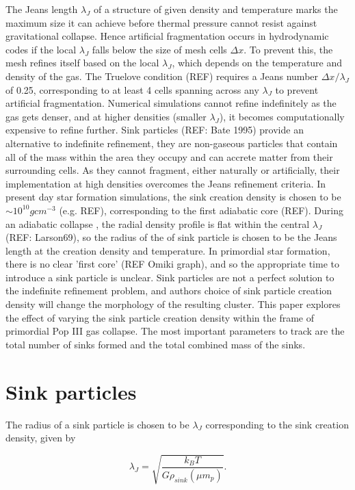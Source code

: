 \documentclass[fleqn,usenatbib]{mnras}
\begin{document}
The Jeans length $\lambda_J$ of a structure of given density and temperature marks the maximum size it can achieve before thermal pressure cannot resist against gravitational collapse. Hence artificial fragmentation occurs in hydrodynamic codes if the local $\lambda_J$ falls below the size of mesh cells $\Delta x$. To prevent this, the mesh refines itself based on the local $\lambda_J$, which depends on the temperature and density of the gas. The Truelove condition (REF) requires a Jeans number $\Delta x/\lambda_J$ of 0.25, corresponding to at least 4 cells spanning across any $\lambda_J$ to prevent artificial fragmentation. Numerical simulations cannot refine indefinitely as the gas gets denser, and at higher densities (smaller $\lambda_J$), it becomes computationally expensive to refine further. Sink particles (REF: Bate 1995) provide an alternative to indefinite refinement, they are non-gaseous particles that contain all of the mass within the area they occupy and can accrete matter from their surrounding cells. As they cannot fragment, either naturally or artificially, their implementation at high densities  overcomes the Jeans refinement criteria. In present day star formation simulations, the sink creation density is chosen to be $\sim 10^{10}gcm^{-3}$ (e.g. REF), corresponding to the first adiabatic core (REF). During an adiabatic collapse , the radial density profile is flat within the central $\lambda_J$ (REF: Larson69), so the radius of the of sink particle is chosen to be the Jeans length at the creation density and temperature. In primordial star formation, there is no clear 'first core' (REF Omiki graph), and so the appropriate time to introduce a sink particle is unclear. Sink particles are not a perfect solution to the indefinite refinement problem, and authors choice of sink particle creation density will change the morphology  of the resulting cluster. This paper explores the effect of varying the sink particle creation density within the frame of primordial Pop III gas collapse. The most important parameters to track are the total number of sinks formed and the total combined mass of the sinks.

\section{Sink particles}

The radius of a sink particle is chosen to be $\lambda_J$ corresponding to the sink creation density, given by


\begin{equation}
    \lambda_J=\sqrt{  \frac{k_B T} {G \rho_{sink} (\mu m_p)}}.
	\label{eq:jeans}
\end{equation}
\end{document}
